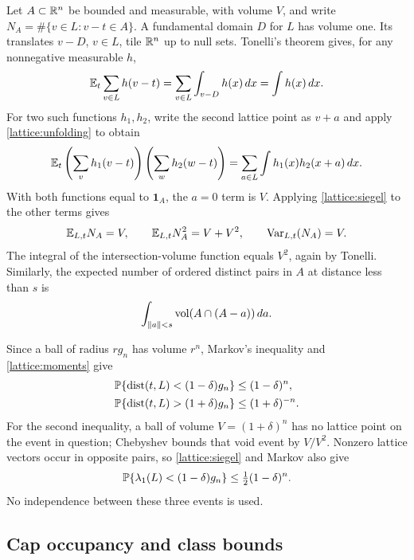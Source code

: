 Let $A\subset\mathbb{R}^n$ be bounded and measurable, with volume $V$, and write
$N_A=\#\{v\in L:v-t\in A\}$. A fundamental domain $D$ for $L$ has
volume one. Its translates $v-D$, $v\in L$, tile $\mathbb{R}^n$ up to null sets.
Tonelli's theorem gives, for any nonnegative measurable $h$,
\begin{equation}
 \mathbb{E}_t\sum_{v\in L}h(v-t)
 =\sum_{v\in L}\int_{v-D}h(x)\,dx=\int h(x)\,dx.
 \label{lattice:unfolding}
\end{equation}
For two such functions $h_1,h_2$, write the second lattice point as
$v+a$ and apply \eqref{lattice:unfolding} to obtain
\begin{equation}
 \mathbb{E}_t\left(\sum_vh_1(v-t)\right)
        \left(\sum_wh_2(w-t)\right)
 =\sum_{a\in L}\int h_1(x)h_2(x+a)\,dx.
 \label{lattice:pair-unfolding}
\end{equation}
With both functions equal to $\mathbf1_A$, the $a=0$ term is $V$.
Applying \eqref{lattice:siegel} to the other terms gives
\begin{equation}
 \mathbb{E}_{L,t}N_A=V,
 \qquad \mathbb{E}_{L,t}N_A^2=V+V^2,
 \qquad \operatorname{Var}_{L,t}(N_A)=V.
 \label{lattice:moments}
\end{equation}
The integral of the intersection-volume function equals $V^2$, again by
Tonelli. Similarly, the expected number of ordered distinct pairs in $A$
at distance less than $s$ is
\begin{equation}
 \int_{\|a\|<s}\operatorname{vol}(A\cap(A-a))\,da.
 \label{lattice:close-pairs}
\end{equation}

Since a ball of radius $r g_n$ has volume $r^n$, Markov's inequality and
\eqref{lattice:moments} give
\begin{align}
 \mathbb{P}\{\operatorname{dist}(t,L)<(1-\delta)g_n\}&\le(1-\delta)^n,
 \label{lattice:radius-low}\\
 \mathbb{P}\{\operatorname{dist}(t,L)>(1+\delta)g_n\}&\le(1+\delta)^{-n}.
 \label{lattice:radius-high}
\end{align}
For the second inequality, a ball of volume $V=(1+\delta)^n$ has no
lattice point on the event in question; Chebyshev bounds that void event
by $V/V^2$. Nonzero lattice vectors occur in opposite pairs, so
\eqref{lattice:siegel} and Markov also give
\begin{equation}
 \mathbb{P}\{\lambda_1(L)<(1-\delta)g_n\}
 \le\tfrac12(1-\delta)^n.
 \label{lattice:short-vector}
\end{equation}
No independence between these three events is used.

\subsection{Cap occupancy and class bounds}
\label{app:lattice:cap-proof}

